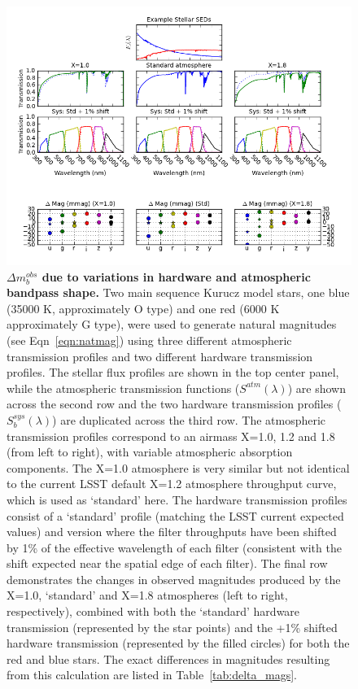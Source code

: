 \documentclass[12pt,preprint]{aastex}
\begin{document}
\begin{figure}[htbp]
\includegraphics[width=6in]{delta_mags}
\caption{ {\small {\bf $\Delta m_b^{obs}$ due to variations in
hardware and atmospheric bandpass shape.} Two main sequence Kurucz model
stars, one blue (35000 K, approximately O type) and one red (6000 K
approximately G type), were used to generate
natural magnitudes (see 
Eqn~\ref{eqn:natmag}) using three different atmospheric transmission
profiles and two different hardware transmission profiles. The stellar
flux profiles are shown in the top center panel, while the atmospheric
transmission functions ($S^{atm}(\lambda)$) are shown across the
second row and the two hardware transmission profiles
($S_b^{sys}(\lambda)$) are duplicated across the third row. The
atmospheric transmission profiles correspond to an airmass X=1.0, 1.2
and 1.8 (from left to right), with variable atmospheric absorption
components. The X=1.0 atmosphere is very similar but not
identical to the current LSST default X=1.2 atmosphere throughput
curve, which is used as `standard' here. The hardware transmission
profiles consist of a `standard' profile (matching the LSST current
expected values) and version where the filter throughputs have been
shifted by 1\% of the effective wavelength of each filter (consistent
with the shift expected near the spatial edge of each filter). The final row
demonstrates the changes in observed magnitudes produced by the X=1.0,
`standard' and X=1.8 atmospheres (left to right, respectively),
combined with both the `standard' hardware transmission (represented by
the star points) and the +1\% shifted hardware transmission (represented
by the filled circles) for both the red and blue stars. The exact
differences in magnitudes resulting from this calculation are listed in
Table~\ref{tab:delta_mags}. }
\label{fig:delta_mags} }
\end{figure}
\end{document}
